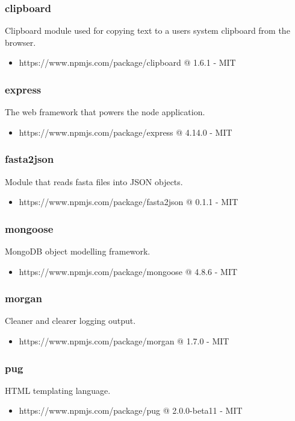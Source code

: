   \subsubsection{clipboard}
  Clipboard module used for copying text to a users system clipboard from the browser.
  \begin{itemize}
    \item https://www.npmjs.com/package/clipboard @ 1.6.1 - MIT
  \end{itemize}

  \subsubsection{express}
  The web framework that powers the node application.
  \begin{itemize}
    \item https://www.npmjs.com/package/express @ 4.14.0 - MIT
  \end{itemize}

  \subsubsection{fasta2json}
  Module that reads fasta files into JSON objects.
  \begin{itemize}
    \item https://www.npmjs.com/package/fasta2json @ 0.1.1 - MIT
  \end{itemize}

  \subsubsection{mongoose}
  MongoDB object modelling framework.
  \begin{itemize}
    \item https://www.npmjs.com/package/mongoose @ 4.8.6 - MIT
  \end{itemize}

  \subsubsection{morgan}
  Cleaner and clearer logging output.
  \begin{itemize}
    \item https://www.npmjs.com/package/morgan @ 1.7.0 - MIT
  \end{itemize}

  \subsubsection{pug}
  HTML templating language.
  \begin{itemize}
    \item https://www.npmjs.com/package/pug @ 2.0.0-beta11 - MIT
  \end{itemize}

